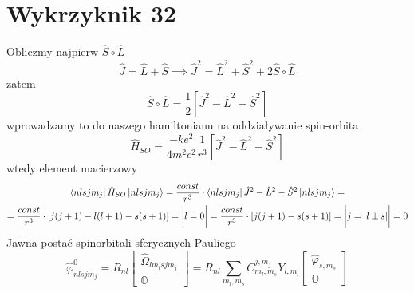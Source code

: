 \documentclass[a4paper,12pt]{article}
\begin{document}
\section{Wykrzyknik 32}
 	Obliczmy najpierw $\hat{S}\circ\hat{L}$ 
 		$$
 		\hat{J}= \hat{L}+\hat{S} \implies \hat{J}^2 = \hat{L}^2+\hat{S}^2 + 2\hat{S}\circ\hat{L}
 		$$
 	zatem
 		$$
 		\hat{S}\circ\hat{L}=\frac{1}{2}\left[\hat{J}^2-\hat{L}^2-\hat{S}^2 \right]
 		$$
 	wprowadzamy to do naszego hamiltonianu na oddziaływanie spin-orbita 
 		$$
 		\hat{H}_{SO} = \frac{-ke^2}{4m^2c^2}\frac{1}{r^3}\left[\hat{J}^2-\hat{L}^2-\hat{S}^2 \right]
 		$$
 	wtedy element macierzowy
 		$$
 		\begin{gathered}
 			\bra{nlsjm_j}\hat{H}_{SO}\ket{nlsjm_j} = \frac{const}{r^3}\cdot\bra{nlsjm_j}\hat{J}^2-\hat{L}^2-\hat{S}^2\ket{nlsjm_j} = \\ =\frac{const}{r^3}\cdot\left[j(j+1) - l(l+1)-s(s+1)\right] = \bigg\vert l = 0\bigg\vert = \frac{const}{r^3}\cdot\left[j(j+1) -s(s+1)\right] = \bigg\vert j = |l\pm s| \bigg\vert = 0
 		\end{gathered}
 		$$
Jawna postać spinorbitali sferycznych Pauliego
$$
\hat{\varphi}_{nlsjm_j}^{0} = R_{nl}\begin{bmatrix}
\hat{\Omega}_{lm_lsjm_j} \\ 
\mathbb{O} \end{bmatrix} =  R_{nl}\sum\limits_{m_l,m_s}C^{j,m_j}_{m_l,m_s} Y_{l,m_l}\begin{bmatrix}\hat{\varphi}_{s,m_s} \\ \mathbb{O} \end{bmatrix}
$$
\end{document}
